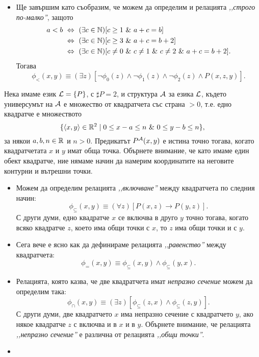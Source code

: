 \begin{example}
\begin{itemize}
  \item
    Ще завършим като съобразим, че можем да определим и релацията \emph{,,строго по-малко''}, защото
    \begin{align*}
      a < b & \iff (\exists c\in\Nat)[ c \geq 1\ \&\ a + c = b ]\\
            & \iff (\exists c\in\Nat)[ c \geq 3\ \&\ a + c = b + 2 ]\\
            & \iff (\exists c\in\Nat)[ c \neq 0\ \&\ c \neq 1\ \&\ c \neq 2\ \&\ a + c = b + 2 ].
    \end{align*}
    Тогава
    \[\phi_{<}(x,y) \equiv (\exists z)[\neg \phi_0(z) \land \neg \phi_1(z) \land \neg \phi_2(z) \land P(x,z,y)].\]
  \end{itemize}
\end{example}

\begin{example}
  Нека имаме език $\mathcal{L} = \{P\}$, с $\sharp P = 2$, и структура $\mathcal{A}$ за езика $\mathcal{L}$, където
  универсумът на $\mathcal{A}$ е множество от квадратчета със страна $> 0$, т.е.
  едно квадратче е множеството
  \[\{\langle{x,y}\rangle \in \mathbb{R}^2 \mid 0 \leq x - a \leq n\ \&\ 0 \leq y-b \leq n\},\]
  за някои $a, b, n \in \mathbb{R}$ и $n > 0$.
  Предикатът $P^{\mathcal{A}}(x,y)$ е истина точно тогава, когато квадратчетата $x$ и $y$ имат обща точка.
  Обърнете внимание, че като имаме един обект квадратче, ние нямаме начин да намерим координатите на неговите контурни и вътрешни точки.
  \begin{itemize}
  \item
    Можем да определим релацията \emph{,,включване''} между квадратчета по следния начин:
    \[\phi_{\subseteq}(x,y) \equiv (\forall z)[P(x,z) \to P(y,z)].\]
    С други думи, едно квадратче $x$ се включва в друго $y$ точно тогава, когато
    всяко квадратче $z$, което има общи точки с $x$, то $z$ има общи точки и с $y$.
  \item
    Сега вече е ясно как да дефинираме релацията \emph{,,равенство''} между квадратчета:
    \[\phi_{=}(x,y) \equiv \phi_{\subseteq}(x,y) \land \phi_{\subseteq}(y,x).\]
  \item
    Релацията, която казва, че две квадратчета имат \emph{непразно сечение} можем да определим така:
    \[\phi_{\cap}(x,y) \equiv (\exists z)[\phi_{\subseteq}(z,x) \land \phi_{\subseteq}(z,y)].\]
    С други думи, две квадратчето $x$ има непразно сечение с квадратчето $y$, ако някое
    квадратче $z$ с включва и в $x$ и в $y$.
    Обърнете внимание, че релацията \emph{,,непразно сечение''} е различна от релацията \emph{,,общи точки''}.
  \item

\end{itemize}
\end{example}
